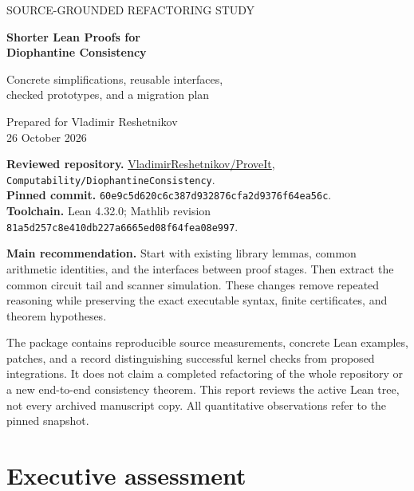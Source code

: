 \documentclass[11pt,letterpaper]{article}
\newcommand{\code}[1]{\nolinkurl{#1}}
\begin{document}
\begin{titlepage}
\vspace*{0.7in}
{\color{accent}\sffamily\large SOURCE-GROUNDED REFACTORING STUDY\par}
\vspace{0.3in}
{\color{ink}\sffamily\bfseries\Huge Shorter Lean Proofs for\\[4pt] Diophantine Consistency\par}
\vspace{0.3in}
{\Large Concrete simplifications, reusable interfaces,\\checked prototypes, and a migration plan\par}
\vspace{0.45in}
Prepared for Vladimir Reshetnikov\\
26 October 2026
\vspace{0.3in}

\textbf{Reviewed repository.}
\href{https://github.com/VladimirReshetnikov/ProveIt}{VladimirReshetnikov/ProveIt},
\code{Computability/DiophantineConsistency}.\\
\textbf{Pinned commit.} \code{60e9c5d620c6c387d932876cfa2d9376f64ea56c}.\\
\textbf{Toolchain.} Lean 4.32.0; Mathlib revision
\code{81a5d257c8e410db227a6665ed08f64fea08e997}.

\vspace{0.4in}
\textbf{Main recommendation.}
Start with existing library lemmas, common arithmetic identities, and the
interfaces between proof stages. Then extract the common circuit tail and
scanner simulation. These changes remove repeated reasoning while preserving
the exact executable syntax, finite certificates, and theorem hypotheses.

The package contains reproducible source measurements, concrete Lean examples,
patches, and a record distinguishing successful kernel checks from proposed
integrations. It does not claim a completed refactoring of the whole repository
or a new end-to-end consistency theorem.
\vfill
{\small This report reviews the active Lean tree, not every archived manuscript
copy. All quantitative observations refer to the pinned snapshot.}
\end{titlepage}

\section*{Executive assessment}
\end{document}
